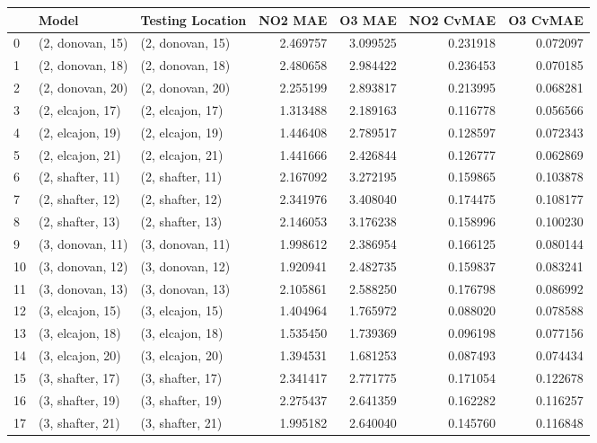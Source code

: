 \begin{tabular}{lllrrrr}
\toprule
{} &             Model &  Testing Location &   NO2 MAE &    O3 MAE &  NO2 CvMAE &  O3 CvMAE \\
\midrule
0  &  (2, donovan, 15) &  (2, donovan, 15) &  2.469757 &  3.099525 &   0.231918 &  0.072097 \\
1  &  (2, donovan, 18) &  (2, donovan, 18) &  2.480658 &  2.984422 &   0.236453 &  0.070185 \\
2  &  (2, donovan, 20) &  (2, donovan, 20) &  2.255199 &  2.893817 &   0.213995 &  0.068281 \\
3  &  (2, elcajon, 17) &  (2, elcajon, 17) &  1.313488 &  2.189163 &   0.116778 &  0.056566 \\
4  &  (2, elcajon, 19) &  (2, elcajon, 19) &  1.446408 &  2.789517 &   0.128597 &  0.072343 \\
5  &  (2, elcajon, 21) &  (2, elcajon, 21) &  1.441666 &  2.426844 &   0.126777 &  0.062869 \\
6  &  (2, shafter, 11) &  (2, shafter, 11) &  2.167092 &  3.272195 &   0.159865 &  0.103878 \\
7  &  (2, shafter, 12) &  (2, shafter, 12) &  2.341976 &  3.408040 &   0.174475 &  0.108177 \\
8  &  (2, shafter, 13) &  (2, shafter, 13) &  2.146053 &  3.176238 &   0.158996 &  0.100230 \\
9  &  (3, donovan, 11) &  (3, donovan, 11) &  1.998612 &  2.386954 &   0.166125 &  0.080144 \\
10 &  (3, donovan, 12) &  (3, donovan, 12) &  1.920941 &  2.482735 &   0.159837 &  0.083241 \\
11 &  (3, donovan, 13) &  (3, donovan, 13) &  2.105861 &  2.588250 &   0.176798 &  0.086992 \\
12 &  (3, elcajon, 15) &  (3, elcajon, 15) &  1.404964 &  1.765972 &   0.088020 &  0.078588 \\
13 &  (3, elcajon, 18) &  (3, elcajon, 18) &  1.535450 &  1.739369 &   0.096198 &  0.077156 \\
14 &  (3, elcajon, 20) &  (3, elcajon, 20) &  1.394531 &  1.681253 &   0.087493 &  0.074434 \\
15 &  (3, shafter, 17) &  (3, shafter, 17) &  2.341417 &  2.771775 &   0.171054 &  0.122678 \\
16 &  (3, shafter, 19) &  (3, shafter, 19) &  2.275437 &  2.641359 &   0.162282 &  0.116257 \\
17 &  (3, shafter, 21) &  (3, shafter, 21) &  1.995182 &  2.640040 &   0.145760 &  0.116848 \\

\end{tabular}
